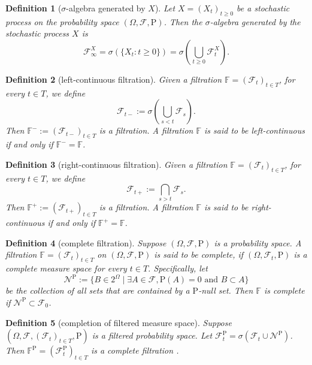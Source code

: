 \documentclass{report}
\newtheorem{definition}{Definition}[section]
\theoremstyle{nonumberplain}
\begin{document}
\begin{definition}[$\sigma$-algebra generated by $X$]
	Let $X=(X_{t})_{t\ge 0}$ be a stochastic process on the probability space $(\Omega,\mathcal{F},\mathrm{P})$. Then the \emph{$\sigma$-algebra generated by the stochastic process $X$} is
	\[
	{\mathcal {F}}_{\infty}^X=\sigma (\{X_{t}:t\ge 0\})=\sigma\left(\bigcup_{t\ge 0} \mathcal{F}^X_t\right).
	\]
\end{definition}

\begin{definition}[left-continuous filtration]
	Given a filtration $\mathbb{F}=(\mathcal{F}_{t})_{t\in T}$, for every $t\in T$, we define
	\[
	\mathcal{F}_{t-}:=\sigma\left(\bigcup_{s<t}\mathcal{F}_{s}\right).
	\]
	Then $\mathbb{F}^-:=({\mathcal{F}}_{t-})_{t\in T}$ is a filtration. A filtration $\mathbb {F}$ is said to be \emph{left-continuous} if and only if $\mathbb{F}^{-}=\mathbb {F}$.
\end{definition}
\begin{definition}[right-continuous filtration]
	Given a filtration $\mathbb{F}=(\mathcal{F}_{t})_{t\in T}$, for every $t\in T$, we define
	\[
	\mathcal{F}_{t+}:=\bigcap_{s>t}\mathcal{F}_{s}.
	\]
	Then $\mathbb{F}^+:=({\mathcal{F}}_{t+})_{t\in T}$ is a filtration. A filtration $\mathbb {F}$ is said to be \emph{right-continuous} if and only if $\mathbb{F}^{+}=\mathbb {F}$.
\end{definition}

\begin{definition}[complete filtration]
	Suppose $(\Omega,\mathcal{F},\mathrm{P})$ is a probability space. A filtration $\mathbb{F} =(\mathcal{F}_{t})_{t\in T}$ on $(\Omega,\mathcal{F},\mathrm{P})$ is said to be \emph{complete}, if $(\Omega,\mathcal{F}_{t},\mathrm{P})$ is a complete measure space for every $t\in T$. 
	Specifically, let
	\[
		\mathcal{N}^{\mathrm{P}}:=\{B\in 2^\Omega \mid \exists A\in\mathcal{F},\mathrm{P}(A)=0\text{ and }B\subset A\}
	\]
	be the collection of all sets that are contained by a $\mathrm{P}$-null set. Then $\mathbb{F}$ is complete if $\mathcal{N}^{\mathrm{P}}\subset \mathcal{F}_{0}$. 
\end{definition}

\begin{definition}[completion of filtered measure space]
	Suppose $(\Omega,\mathcal{F},(\mathcal{F}_{t})_{t\in T }, \mathrm{P})$ is a filtered probability space. Let $\mathcal{F}_{t}^{\mathrm{P}}=\sigma\left(\mathcal{F}_{t} \cup \mathcal{N}^{\mathrm{P}}\right)$. Then $\mathbb{F}^{\mathrm{P}} =(\mathcal{F}_{t}^{\mathrm{P}})_{t\in T}$ is a complete filtration .
\end{definition}
\end{document}
